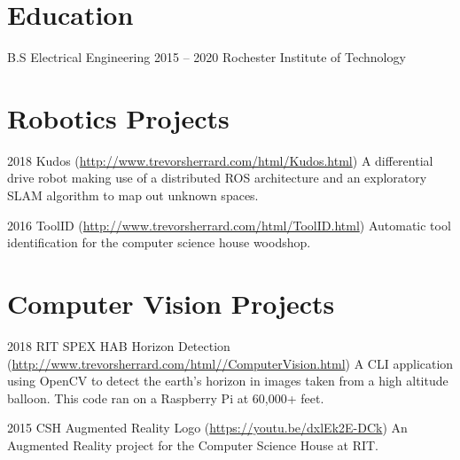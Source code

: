 \documentclass{tccv}
\begin{document}
\section{Education}

\begin{yearlist}

\item[B.S Electrical Engineering]{2015 -- 2020}
     {Rochester Institute of Technology}
     
\end{yearlist}


\section{Robotics Projects}

\begin{yearlist}

\item{2018}
     {Kudos (\href{http://www.trevorsherrard.com/html/Kudos.html}{http://www.trevorsherrard.com\newline/html/Kudos.html})}
     {A differential drive robot making use of a distributed ROS architecture and an exploratory SLAM algorithm to map out unknown spaces.}

\item{2016}
     {ToolID (\href{http://www.trevorsherrard.com/html/ToolID.html}
     {http://www.trevorsherrard.com\newline/html/ToolID.html})}
     {Automatic tool identification for the computer science house woodshop. }
     
\end{yearlist}


\section{Computer Vision Projects}

\begin{yearlist}

\item{2018}
     {RIT SPEX HAB Horizon Detection (\href{http://www.trevorsherrard.com/html/ComputerVision.html}{http://www.trevorsherrard.com/html/\newline/ComputerVision.html})}
     {A CLI application using OpenCV to detect the earth's horizon in images taken from a high altitude balloon. This code ran on a Raspberry Pi at 60,000+ feet.}
    
\item{2015}
     {CSH Augmented Reality Logo (\href{https://youtu.be/dxlEk2E-DCk}{https://youtu.be/dxlEk2E-DCk})}
     {An Augmented Reality project for the Computer Science House at RIT.}

\end{yearlist}
\end{document}
